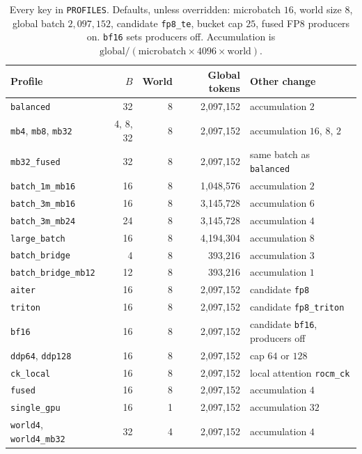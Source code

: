 \documentclass[11pt]{article}
\DeclareRobustCommand{\code}[1]{\texttt{#1}}
\begin{document}
\begin{table}[t]
\centering
\caption{Every key in \code{PROFILES}. Defaults, unless overridden:
microbatch \(16\), world size \(8\), global batch \(2{,}097{,}152\),
candidate \code{fp8\_te}, bucket cap \(25\), fused FP8 producers on.
\code{bf16} sets producers off.
Accumulation is \(\mathrm{global}/(\mathrm{microbatch}\times 4096\times\mathrm{world})\).}
\label{tab:profiles}
\small
\begin{tabular}{@{}lrrrl@{}}
\toprule
Profile & \(B\) & World & Global tokens & Other change \\
\midrule
\code{balanced} & 32 & 8 & 2{,}097{,}152 & accumulation \(2\) \\
\code{mb4}, \code{mb8}, \code{mb32} & 4, 8, 32 & 8 & 2{,}097{,}152 & accumulation \(16\), \(8\), \(2\) \\
\code{mb32\_fused} & 32 & 8 & 2{,}097{,}152 & same batch as \code{balanced} \\
\code{batch\_1m\_mb16} & 16 & 8 & 1{,}048{,}576 & accumulation \(2\) \\
\code{batch\_3m\_mb16} & 16 & 8 & 3{,}145{,}728 & accumulation \(6\) \\
\code{batch\_3m\_mb24} & 24 & 8 & 3{,}145{,}728 & accumulation \(4\) \\
\code{large\_batch} & 16 & 8 & 4{,}194{,}304 & accumulation \(8\) \\
\code{batch\_bridge} & 4 & 8 & 393{,}216 & accumulation \(3\) \\
\code{batch\_bridge\_mb12} & 12 & 8 & 393{,}216 & accumulation \(1\) \\
\code{aiter} & 16 & 8 & 2{,}097{,}152 & candidate \code{fp8} \\
\code{triton} & 16 & 8 & 2{,}097{,}152 & candidate \code{fp8\_triton} \\
\code{bf16} & 16 & 8 & 2{,}097{,}152 & candidate \code{bf16}, producers off \\
\code{ddp64}, \code{ddp128} & 16 & 8 & 2{,}097{,}152 & cap \(64\) or \(128\) \\
\code{ck\_local} & 16 & 8 & 2{,}097{,}152 & local attention \code{rocm\_ck} \\
\code{fused} & 16 & 8 & 2{,}097{,}152 & accumulation \(4\) \\
\code{single\_gpu} & 16 & 1 & 2{,}097{,}152 & accumulation \(32\) \\
\code{world4}, \code{world4\_mb32} & 32 & 4 & 2{,}097{,}152 & accumulation \(4\) \\
\bottomrule
\end{tabular}
\end{table}
\end{document}
